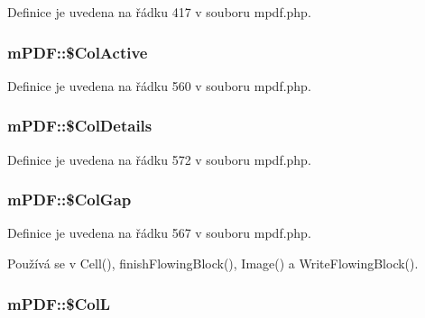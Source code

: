 Definice je uvedena na řádku 417 v souboru mpdf.\-php.

\hypertarget{classm_p_d_f_a1a3151a1fd57c33458fe2f6c487358f9}{
\subsubsection[{\$\-Col\-Active}]{\setlength{\rightskip}{0pt plus 5cm}m\-P\-D\-F\-::\$\-Col\-Active}}\label{classm_p_d_f_a1a3151a1fd57c33458fe2f6c487358f9}


Definice je uvedena na řádku 560 v souboru mpdf.\-php.

\hypertarget{classm_p_d_f_aeceaca485aaacc2226164eaa7629f0f0}{
\subsubsection[{\$\-Col\-Details}]{\setlength{\rightskip}{0pt plus 5cm}m\-P\-D\-F\-::\$\-Col\-Details}}\label{classm_p_d_f_aeceaca485aaacc2226164eaa7629f0f0}


Definice je uvedena na řádku 572 v souboru mpdf.\-php.

\hypertarget{classm_p_d_f_afd09d79d07fa49c58709c8c5772e0832}{
\subsubsection[{\$\-Col\-Gap}]{\setlength{\rightskip}{0pt plus 5cm}m\-P\-D\-F\-::\$\-Col\-Gap}}\label{classm_p_d_f_afd09d79d07fa49c58709c8c5772e0832}


Definice je uvedena na řádku 567 v souboru mpdf.\-php.



Používá se v Cell(), finish\-Flowing\-Block(), Image() a Write\-Flowing\-Block().

\hypertarget{classm_p_d_f_a7a40d8a13d490c6f1c401df5e567cd79}{
\subsubsection[{\$\-Col\-L}]{\setlength{\rightskip}{0pt plus 5cm}m\-P\-D\-F\-::\$\-Col\-L}}\label{classm_p_d_f_a7a40d8a13d490c6f1c401df5e567cd79}


